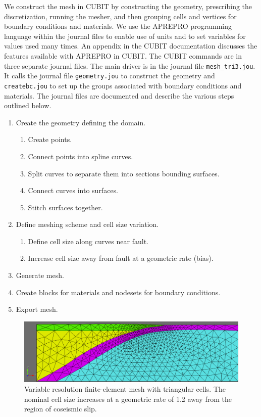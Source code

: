 We construct the mesh in CUBIT by constructing the geometry, prescribing
the discretization, running the mesher, and then grouping cells and
vertices for boundary conditions and materials. We use the APREPRO
programming language within the journal files to enable use of units
and to set variables for values used many times. An appendix in the
CUBIT documentation discusses the features available with APREPRO
in CUBIT. The CUBIT commands are in three separate journal files.
The main driver is in the journal file \texttt{mesh\_tri3.jou}. It
calls the journal file \texttt{geometry.jou} to construct the geometry
and \texttt{createbc.jou} to set up the groups associated with boundary
conditions and materials. The journal files are documented and describe
the various steps outlined below.
\begin{enumerate}
\item Create the geometry defining the domain.

\begin{enumerate}
\item Create points.
\item Connect points into spline curves.
\item Split curves to separate them into sections bounding surfaces. 
\item Connect curves into surfaces.
\item Stitch surfaces together.
\end{enumerate}
\item Define meshing scheme and cell size variation.

\begin{enumerate}
\item Define cell size along curves near fault.
\item Increase cell size away from fault at a geometric rate (bias).
\end{enumerate}
\item Generate mesh.
\item Create blocks for materials and nodesets for boundary conditions.
\item Export mesh.
\end{enumerate}
\begin{figure}
\begin{centering}
\includegraphics[width=4.5in]{tutorials/subduction/figs/subduction_tri3}
\par\end{centering}

\caption{Variable resolution finite-element mesh with triangular cells. The
nominal cell size increases at a geometric rate of 1.2 away from the
region of coseismic slip.\label{fig:tutorial:subduction:mesh}}
\end{figure}



